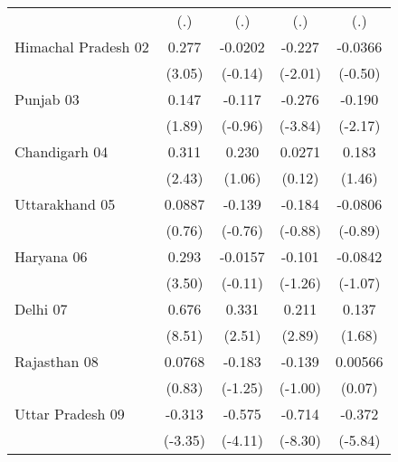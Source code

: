 {\begin{tabular}{l*{4}{c}}
                    &         (.)         &         (.)         &         (.)         &         (.)         \\
[1em]
Himachal Pradesh 02 &       0.277\sym{**} &     -0.0202         &      -0.227\sym{*}  &     -0.0366         \\
                    &      (3.05)         &     (-0.14)         &     (-2.01)         &     (-0.50)         \\
[1em]
Punjab 03           &       0.147         &      -0.117         &      -0.276\sym{***}&      -0.190\sym{*}  \\
                    &      (1.89)         &     (-0.96)         &     (-3.84)         &     (-2.17)         \\
[1em]
Chandigarh 04       &       0.311\sym{*}  &       0.230         &      0.0271         &       0.183         \\
                    &      (2.43)         &      (1.06)         &      (0.12)         &      (1.46)         \\
[1em]
Uttarakhand 05      &      0.0887         &      -0.139         &      -0.184         &     -0.0806         \\
                    &      (0.76)         &     (-0.76)         &     (-0.88)         &     (-0.89)         \\
[1em]
Haryana 06          &       0.293\sym{***}&     -0.0157         &      -0.101         &     -0.0842         \\
                    &      (3.50)         &     (-0.11)         &     (-1.26)         &     (-1.07)         \\
[1em]
Delhi 07            &       0.676\sym{***}&       0.331\sym{*}  &       0.211\sym{**} &       0.137         \\
                    &      (8.51)         &      (2.51)         &      (2.89)         &      (1.68)         \\
[1em]
Rajasthan 08        &      0.0768         &      -0.183         &      -0.139         &     0.00566         \\
                    &      (0.83)         &     (-1.25)         &     (-1.00)         &      (0.07)         \\
[1em]
Uttar Pradesh 09    &      -0.313\sym{***}&      -0.575\sym{***}&      -0.714\sym{***}&      -0.372\sym{***}\\
                    &     (-3.35)         &     (-4.11)         &     (-8.30)         &     (-5.84)         \\

\end{tabular}}
